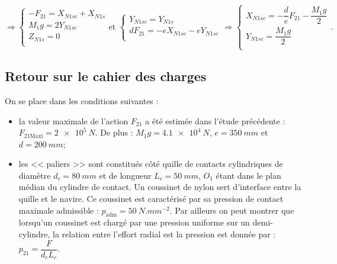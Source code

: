 \documentclass[10pt,fleqn]{article} %
\begin{document}
\begin{multicols}{2}
\begin{corrige}
$$
\Rightarrow 
\left\{
\begin{array}{l}
- F_{21} = X_{N1sc}+X_{N1s} \\
M_1g= 2Y_{N1sc} \\
Z_{N1s} = 0  \\
\end{array}
\right.
\text{et }
\left\{
\begin{array}{l}
 Y_{N1sc}= Y_{N1s} \\
dF_{21}= -e X_{N1sc}-e Y_{N1sc} \\
\end{array}
\right.
\Rightarrow 
\left\{
\begin{array}{l}
X_{N1sc}=-\dfrac{d}{e}F_{21} - \dfrac{M_1g}{2} \\
Y_{N1sc} = \dfrac{M_1g}{2}\\%
\end{array}
\right. .
$$

\end{corrige}
\else
\fi


\subsection*{Retour sur le cahier des charges}
\ifprof
\else

On se place dans les conditions suivantes :
\begin{itemize}
\item la valeur maximale de l’action $F_{21}$ a été estimée dans l’étude précédente : $F_{21\text{Maxi}}=\SI{2e5}{N}$. De
plus : $M_1 g = \SI{4,1e4}{N}$, $e=\SI{350}{mm}$ et $d=\SI{200}{mm}$;
\item les << paliers >> sont constitués côté quille de contacts cylindriques de diamètre $d_c =\SI{80}{mm}$ et de longueur $L_c =\SI{50}{mm}$, $O_1$ étant dans le plan médian du cylindre de contact. Un coussinet de nylon
sert d’interface entre la quille et le navire. Ce coussinet est caractérisé par sa pression de contact
maximale admissible : $p_{\text{adm}}= \SI{50}{N.mm^{-2}}$. Par ailleurs on peut montrer que lorsqu'un coussinet est chargé par une pression uniforme sur un demi-cylindre, la relation entre l'effort radial est la pression est donnée par : $p_{21}=\dfrac{F}{d_cL_c}$.
\end{itemize}
\fi


\end{multicols}
\end{document}
